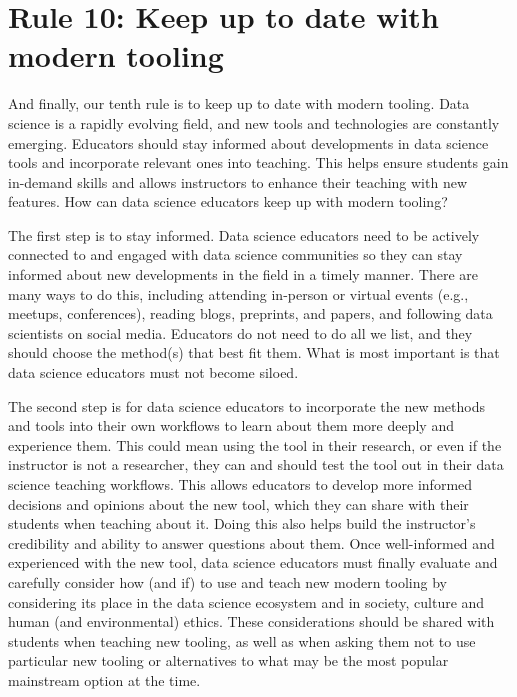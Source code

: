 \documentclass[
  10pt,
  letterpaper,
]{article}
\begin{document}
\section{Rule 10: Keep up to date with modern tooling}\label{sec-rule10}

And finally, our tenth rule is to keep up to date with modern tooling.
Data science is a rapidly evolving field, and new tools and technologies
are constantly emerging. Educators should stay informed about
developments in data science tools and incorporate relevant ones into
teaching. This helps ensure students gain in-demand skills and allows
instructors to enhance their teaching with new features. How can data
science educators keep up with modern tooling?

The first step is to stay informed. Data science educators need to be
actively connected to and engaged with data science communities so they
can stay informed about new developments in the field in a timely
manner. There are many ways to do this, including attending in-person or
virtual events (e.g., meetups, conferences), reading blogs, preprints,
and papers, and following data scientists on social media. Educators do
not need to do all we list, and they should choose the method(s) that
best fit them. What is most important is that data science educators
must not become siloed.

The second step is for data science educators to incorporate the new
methods and tools into their own workflows to learn about them more
deeply and experience them. This could mean using the tool in their
research, or even if the instructor is not a researcher, they can and
should test the tool out in their data science teaching workflows. This
allows educators to develop more informed decisions and opinions about
the new tool, which they can share with their students when teaching
about it. Doing this also helps build the instructor's credibility and
ability to answer questions about them. Once well-informed and
experienced with the new tool, data science educators must finally
evaluate and carefully consider how (and if) to use and teach new modern
tooling by considering its place in the data science ecosystem and in
society, culture and human (and environmental) ethics. These
considerations should be shared with students when teaching new tooling,
as well as when asking them not to use particular new tooling or
alternatives to what may be the most popular mainstream option at the
time.
\end{document}
